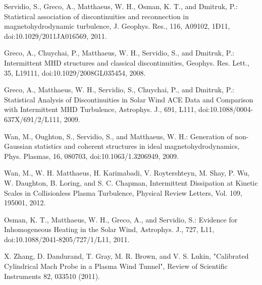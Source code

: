 \documentclass[12pt]{iopart}
\begin{document}
\begin{thebibliography}{10}
Servidio, S., Greco, A., Matthaeus, W. H., Osman, K. T., and Dmitruk, P.: Statistical association of discontinuities and reconnection in magnetohydrodynamic turbulence, J. Geophys. Res., 116, A09102, 1Ð11, doi:10.1029/2011JA016569, 2011.

Greco, A., Chuychai, P., Matthaeus, W. H., Servidio, S., and Dmitruk, P.: Intermittent MHD structures and classical discontinuities, Geophys. Res. Lett., 35, L19111, doi:10.1029/2008GL035454, 2008.

Greco, A., Matthaeus, W. H., Servidio, S., Chuychai, P., and Dmitruk, P.: Statistical Analysis of Discontinuities in Solar Wind ACE Data and Comparison with Intermittent MHD Turbulence, Astrophys. J., 691, L111, doi:10.1088/0004-637X/691/2/L111, 2009.

Wan, M., Oughton, S., Servidio, S., and Matthaeus, W. H.: Generation of non-Gaussian statistics and coherent structures in ideal magnetohydrodynamics, Phys. Plasmas, 16, 080703, doi:10.1063/1.3206949, 2009.

Wan, M., W. H. Matthaeus, H. Karimabadi, V. Roytershteyn, M. Shay, P. Wu, W. Daughton, B. Loring, and S. C. Chapman, Intermittent Dissipation at Kinetic Scales in Collisionless Plasma Turbulence, Physical Review Letters, Vol. 109, 195001, 2012. 

Osman, K. T., Matthaeus, W. H., Greco, A., and Servidio, S.: Evidence for Inhomogeneous Heating in the Solar Wind, Astrophys. J., 727, L11, doi:10.1088/2041-8205/727/1/L11, 2011.

X. Zhang, D. Dandurand, T. Gray, M. R. Brown, and V. S. Lukin, "Calibrated Cylindrical Mach Probe in a Plasma Wind Tunnel", Review of Scientific Instruments 82, 033510 (2011).

\end{thebibliography}
\end{document}
